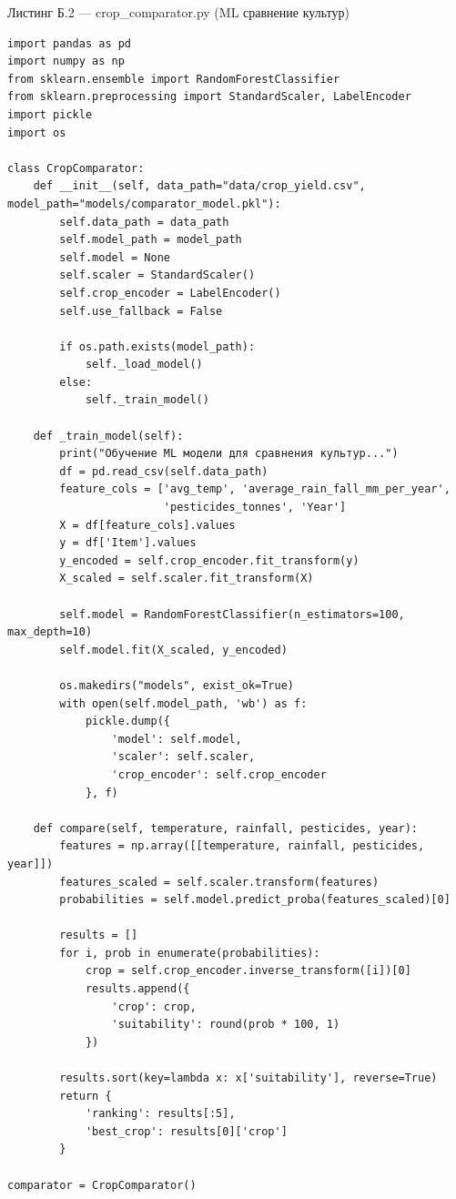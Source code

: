 \documentclass[14pt, a4paper]{extarticle}
\begin{document}
\newpage


Листинг Б.2 — crop_comparator.py (ML сравнение культур)

\begin{verbatim}
import pandas as pd
import numpy as np
from sklearn.ensemble import RandomForestClassifier
from sklearn.preprocessing import StandardScaler, LabelEncoder
import pickle
import os

class CropComparator:
    def __init__(self, data_path="data/crop_yield.csv", model_path="models/comparator_model.pkl"):
        self.data_path = data_path
        self.model_path = model_path
        self.model = None
        self.scaler = StandardScaler()
        self.crop_encoder = LabelEncoder()
        self.use_fallback = False
        
        if os.path.exists(model_path):
            self._load_model()
        else:
            self._train_model()
    
    def _train_model(self):
        print("Обучение ML модели для сравнения культур...")
        df = pd.read_csv(self.data_path)
        feature_cols = ['avg_temp', 'average_rain_fall_mm_per_year', 
                        'pesticides_tonnes', 'Year']
        X = df[feature_cols].values
        y = df['Item'].values
        y_encoded = self.crop_encoder.fit_transform(y)
        X_scaled = self.scaler.fit_transform(X)
        
        self.model = RandomForestClassifier(n_estimators=100, max_depth=10)
        self.model.fit(X_scaled, y_encoded)
        
        os.makedirs("models", exist_ok=True)
        with open(self.model_path, 'wb') as f:
            pickle.dump({
                'model': self.model,
                'scaler': self.scaler,
                'crop_encoder': self.crop_encoder
            }, f)
    
    def compare(self, temperature, rainfall, pesticides, year):
        features = np.array([[temperature, rainfall, pesticides, year]])
        features_scaled = self.scaler.transform(features)
        probabilities = self.model.predict_proba(features_scaled)[0]
        
        results = []
        for i, prob in enumerate(probabilities):
            crop = self.crop_encoder.inverse_transform([i])[0]
            results.append({
                'crop': crop,
                'suitability': round(prob * 100, 1)
            })
        
        results.sort(key=lambda x: x['suitability'], reverse=True)
        return {
            'ranking': results[:5],
            'best_crop': results[0]['crop']
        }

comparator = CropComparator()
\end{verbatim}
\end{document}
